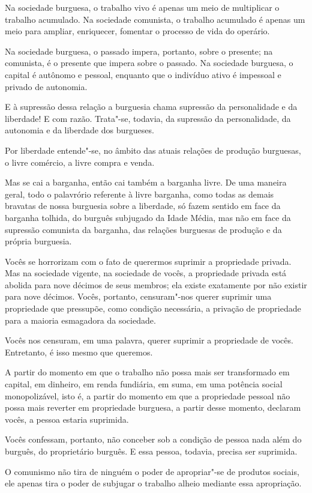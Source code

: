 Na sociedade burguesa, o trabalho vivo é apenas um meio de multiplicar o
trabalho acumulado. Na sociedade comunista, o trabalho acumulado é
apenas um meio para ampliar, enriquecer, fomentar o processo de vida do
operário.

Na sociedade burguesa, o passado impera, portanto, sobre o presente; na
comunista, é o presente que impera sobre o passado. Na sociedade
burguesa, o capital é autônomo e pessoal, enquanto que o indivíduo ativo
é impessoal e privado de autonomia.

E à supressão dessa relação a burguesia chama supressão da personalidade
e da liberdade! E com razão. Trata"-se, todavia, da supressão da
personalidade, da autonomia e da liberdade dos burgueses.

Por liberdade entende"-se, no âmbito das atuais relações de produção
burguesas, o livre comércio, a livre compra e venda.

Mas se cai a barganha, então cai também a barganha livre. De uma maneira
geral, todo o palavrório referente à livre barganha, como todas as
demais bravatas de nossa burguesia sobre a liberdade, só fazem sentido
em face da barganha tolhida, do burguês subjugado da Idade Média, mas
não em face da supressão comunista da barganha, das relações burguesas
de produção e da própria burguesia.

Vocês se horrorizam com o fato de querermos suprimir a propriedade
privada. Mas na sociedade vigente, na sociedade de vocês, a propriedade
privada está abolida para nove décimos de seus membros; ela existe
exatamente por não existir para nove décimos. Vocês, portanto,
censuram"-nos querer suprimir uma propriedade que pressupõe, como
condição necessária, a privação de propriedade para a maioria
esmagadora da sociedade.

Vocês nos censuram, em uma palavra, querer suprimir a propriedade de
vocês. Entretanto, é isso mesmo que queremos.

A partir do momento em que o trabalho não possa mais ser transformado em
capital, em dinheiro, em renda fundiária, em suma, em uma potência social
monopolizável, isto é, a partir do momento em que a propriedade pessoal
não possa mais reverter em propriedade burguesa, a partir desse
momento, declaram vocês, a pessoa estaria suprimida.

Vocês confessam, portanto, não conceber sob a condição de pessoa nada
além do burguês, do proprietário burguês. E essa pessoa, todavia,
precisa ser suprimida.

O comunismo não tira de ninguém o poder de apropriar"-se de produtos
sociais, ele apenas tira o poder de subjugar o trabalho alheio mediante
essa apropriação.

